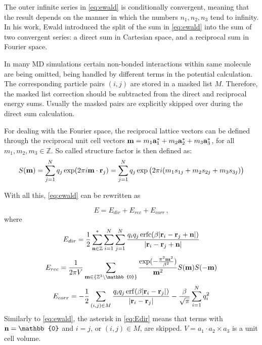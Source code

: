 \documentclass[12pt,a4paper]{report}
\DeclareMathOperator\erf{erf}
\DeclareMathOperator\erfc{erfc}
\begin{document}
The outer infinite series in \eqref{eq:ewald} is conditionally convergent, meaning that the result depends on the manner in which the numbers $n_1, n_2, n_3$ tend to infinity.
In his work, Ewald \cite{pme} introduced the split of the sum in \eqref{eq:ewald} into the sum of two convergent series: a direct sum in Cartesian space, and a
reciprocal sum in Fourier space. 

In many MD simulations certain non-bonded interactions within same molecule are being omitted, being handled by different terms in the potential calculation. The corresponding particle pairs $(i, j)$ are stored in a masked list $M$. Therefore, the masked list correction should be subtracted from the direct and reciprocal energy sums. Usually the masked pairs are explicitly skipped over during the direct sum calculation.	 

For dealing with the Fourier space, the reciprocal lattice vectors can be defined through the reciprocal unit cell vectors $\bold{m} = m_1 \bold{a}_1^* + m_2 \bold{a}_2^* + m_3 \bold{a}_3^*$, for
all $m_1, m_2, m_3 \in \mathbb{Z}$. 
So called structure factor is then defined as:
\begin{equation} \label{eq:Sm}
 S(\bold{m}) = 
\sum\limits_{j=1}^Nq_j \exp(2\pi i\bold{m}\cdot\bold{r}_j)= 
\sum\limits_{j=1}^Nq_j \exp\big(2\pi i(m_1 s_{1j} + m_2 s_{2j}+m_3 s_{3j})\big)
\end{equation}

With all this, \eqref{eq:ewald} can be rewritten as

\[E = E_{dir} + E_{rec} + E_{corr}\,\mathrm{,}\]
where
\begin{equation} \label{eq:Edir}
E_{dir} = \frac{1}{2}\sum\limits_{\bold{n\in \mathbb{Z}}}^*\sum\limits_{i=1}^N\sum\limits_{j=1}^N\frac{q_i q_j \erfc(\beta\lvert\bold{r}_i - \bold{r}_j + \bold{n} \rvert)}{\lvert\bold{r}_i - \bold{r}_j + \bold{n} \rvert}
\end{equation}
\begin{equation} \label{eq:Erec}
E_{rec}=\frac{1}{2\pi V}\sum\limits_{\bold{m} \in \{\mathbb{Z}^3 \setminus \mathbb{0}\}}\frac{\exp(-\frac{\pi^2\bold{m}^2}{\beta^2})}{\bold{m}^2}S(\bold{m})S(\bold{-m})
\end{equation}
\[E_{corr} = -\frac{1}{2}\sum\limits_{(i,j)\in M}\frac{q_i q_j \erf(\beta\lvert\bold{r}_i - \bold{r}_j\rvert)}{\lvert\bold{r}_i - \bold{r}_j\rvert} - \frac{\beta}{\sqrt{\pi}}\sum\limits_{i=1}^N q_i^2\]
Similarly to \eqref{eq:ewald}, the asterisk in \eqref{eq:Edir} means that terms with $\bold{n} = \mathbb{0}$ and $i = j$, or $(i,j)\in M$, are skipped.
$V = a_1 \cdot a_2 \times a_3$ is a unit cell volume.
\end{document}
